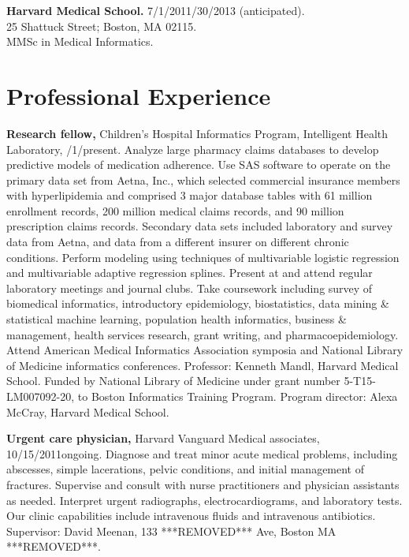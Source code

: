 \documentclass[12pt]{article}
\begin{document}
\textbf{Harvard Medical School.} 7/1/2011/30/2013 (anticipated).\\
25 Shattuck Street; Boston, MA 02115.\\
MMSc in Medical Informatics.

\newpage

\section*{Professional Experience}

\textbf{Research fellow,} Children’s Hospital Informatics Program,
Intelligent Health Lab\-o\-ra\-to\-ry,
/1/\ndash{}\linebreak[0]pres\-ent. Analyze large
pharmacy claims databases to develop predictive models of medication
adherence. Use SAS software to operate on the primary data set from
Aetna, Inc., which selected commercial insurance members with
hyperlipidemia and comprised 3 major database tables with 61 million
enrollment records, 200 million medical claims records, and 90 million
prescription claims records. Secondary data sets included laboratory
and survey data from Aetna, and data from a different insurer on
different chronic conditions. Perform modeling using techniques of
multivariable logistic regression and multivariable adaptive
regression splines. Present at and attend regular laboratory meetings
and journal clubs. Take coursework including survey of biomedical
informatics, introductory epidemiology, biostatistics, data mining \&
statistical machine learning, population health informatics, business
\& management, health services research, grant writing, and
pharmacoepidemiology. Attend American Medical Informatics Association
symposia and National Library of Medicine informatics conferences.
Professor: Kenneth Mandl, Harvard Medical School. Funded by National
Library of Medicine under grant number 5-T15-LM007092-20, to Boston
Informatics Training Program. Program director: Alexa McCray, Harvard
Medical School.

\textbf{Urgent care physician,} Harvard Vanguard Medical associates,
10/15/2011\ndash{}ongoing. Diagnose and treat minor acute medical problems,
including abscesses, simple lacerations, pelvic conditions, and
initial management of fractures. Supervise and consult with nurse
practitioners and physician assistants as needed. Interpret urgent
radiographs, electrocardiograms, and laboratory tests. Our clinic
capabilities include intravenous fluids and intravenous antibiotics.
Supervisor: David Meenan, 133 ***REMOVED*** Ave, Boston MA ***REMOVED***.
\end{document}

